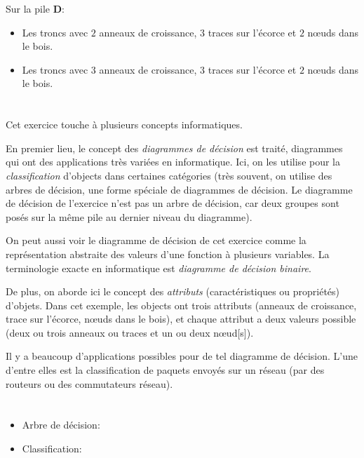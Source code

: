{{Sur la pile \textbf{D}:

\begin{itemize}
  \item Les troncs avec $2$ anneaux de croissance, $3$ traces sur l’écorce et $2$ nœuds dans le bois.
  \item Les troncs avec $3$ anneaux de croissance, $3$ traces sur l’écorce et $2$ nœuds dans le bois.
\end{itemize}



\section*{\BrochureItsInformatics}
Cet exercice touche à plusieurs concepts informatiques.

En premier lieu, le concept des \emph{diagrammes de décision} est traité, diagrammes qui ont des applications très variées en informatique. Ici, on les utilise pour la \emph{classification} d’objects dans certaines catégories (très souvent, on utilise des arbres de décision, une forme spéciale de diagrammes de décision. Le diagramme de décision de l’exercice n’est pas un arbre de décision, car deux groupes sont posés sur la même pile au dernier niveau du diagramme).

On peut aussi voir le diagramme de décision de cet exercice comme la représentation abstraite des valeurs d’une fonction à plusieurs variables. La terminologie exacte en informatique est \emph{diagramme de décision binaire}.

De plus, on aborde ici le concept des \emph{attributs} (caractéristiques ou propriétés) d’objets. Dans cet exemple, les objects ont trois attributs (anneaux de croissance, trace sur l’écorce, nœuds dans le bois), et chaque attribut a deux valeurs possible (deux ou trois anneaux ou traces et un ou deux nœud[s]).

Il y a beaucoup d’applications possibles pour de tel diagramme de décision. L’une d’entre elles est la classification de paquets envoyés sur un réseau (par des routeurs ou des commutateurs réseau).



\section*{\BrochureWebsitesAndKeywords}
{\raggedright
\begin{itemize}
  \item Arbre de décision: \href{https://fr.wikipedia.org/wiki/Arbre_de_d\%C3\%A9cision}{}
  \item Classification: \href{https://fr.wikipedia.org/wiki/Classement_automatique}{}
\end{itemize}


}}}
